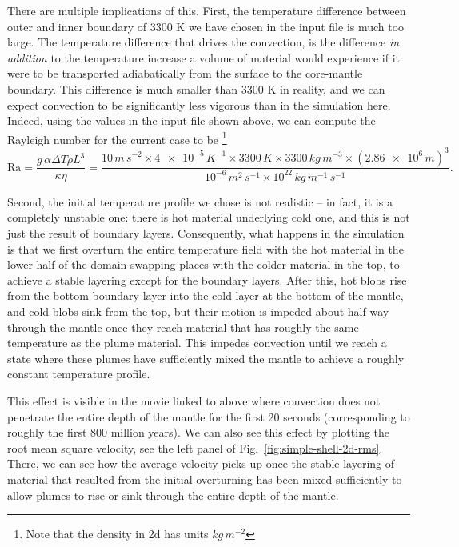 \documentclass{article}
\begin{document}
There are multiple implications of this. First, the temperature difference
between outer and inner boundary of 3300 K we have chosen in the input file is
much too large. The temperature difference that drives the convection,
is the difference \textit{in addition} to the temperature increase a volume of
material would experience if it were to be
transported adiabatically from the surface to the core-mantle boundary. This
difference is much smaller than 3300 K in reality, and we can expect convection
to be significantly less vigorous than in the simulation here. Indeed, using
the values in the input file shown above, we can compute the Rayleigh number for
the current case to be%
\footnote{Note that the density in 2d has units $\si{kg}\,\si{m}^{-2}$}
\begin{equation*}
  \textrm{Ra}
  =
  \frac{g\, \alpha  \Delta T  \rho  L^3}{\kappa\eta}
=
  \frac{10\, \si{m}\,\si{s}^{-2} \times \num{4e-5}\, \si{K}^{-1} \times 3300\,
  \si{K} \times 3300\, \si{kg}\,\si{m}^{-3} \times (\num{2.86e6}
  \, \si{m})^3}{10^{-6}\, \si{m}^2\,\si{s}^{-1}\times 10^{22}\,
  \si{kg}\,\si{m}^{-1}\,\si{s}^{-1}}.
\end{equation*}

Second, the initial temperature profile we chose is not realistic -- in fact, it
is a completely unstable one: there is hot material underlying cold one, and
this is not just the result of boundary layers. Consequently, what happens in
the simulation is that we first overturn the entire temperature field with the
hot material in the lower half of the domain swapping places with the colder
material in the top, to achieve a stable layering except for the boundary
layers. After this, hot blobs rise from the bottom boundary layer into the cold
layer at the bottom of the mantle, and cold blobs sink from the top, but their
motion is impeded about half-way through the mantle once they reach material
that has roughly the same temperature as the plume material. This impedes
convection until we reach a state where these plumes have sufficiently mixed the
mantle to achieve a roughly constant temperature profile.

This effect is visible in the movie linked to above where convection does not
penetrate the entire depth of the mantle for the first 20 seconds
(corresponding to roughly the first 800 million years). We can also see this
effect by plotting the root mean square velocity, see the left panel of
Fig.~\ref{fig:simple-shell-2d-rms}. There, we can see how the average velocity
picks up once the stable layering of material that resulted from the initial
overturning has been mixed sufficiently to allow plumes to rise or sink through
the entire depth of the mantle.
\end{document}
